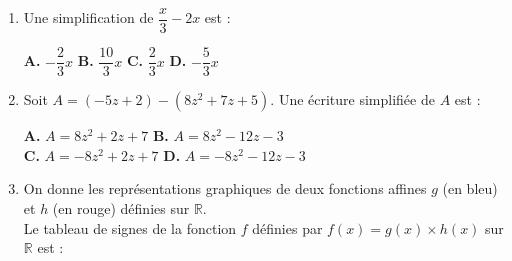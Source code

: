 \documentclass[a4paper,11pt]{article}
\begin{document}
\newpage


\begin{seance}{} %

\begin{enumerate}
\item Une simplification de $\dfrac{x}{3}-2x$ est :


\begin{center}
\textbf{\textcolor{Couleur1}{A.}} $-\dfrac{2}{3}x$ \qquad \textbf{\textcolor{Couleur1}{B.}} $\dfrac{10}{3}x$ \qquad \textbf{\textcolor{Couleur1}{C.}} $\dfrac{2}{3}x$ \qquad \textbf{\textcolor{Couleur1}{D.}} $-\dfrac{5}{3}x$
\end{center}


\item Soit $A= (-5z+2) - (8z^2+7z+5)$. Une écriture simplifiée de $A$ est :


\begin{center}
\textbf{\textcolor{Couleur1}{A.}} $A=8z^2+2z+7$ \qquad \textbf{\textcolor{Couleur1}{B.}} $A=8z^2-12z-3$ \qquad \\ \textbf{\textcolor{Couleur1}{C.}} $A=-8z^2+2z+7$ \qquad \textbf{\textcolor{Couleur1}{D.}} $A=-8z^2-12z-3$
\end{center}


\item On donne les représentations graphiques de deux fonctions affines $g$ (en bleu) et $h$ (en rouge) définies sur $\mathbb{R}$.\\
Le tableau de signes de la fonction $f$ définies par $f(x)=g(x)\times h(x)$ sur $\mathbb{R}$ est  :\\

 \begin{minipage}[c]{0.4\textwidth}
    \begin{tikzpicture}[baseline,scale = 0.5]


\end{tikzpicture}
\end{minipage}
\end{enumerate}
\end{seance}
\end{document}
